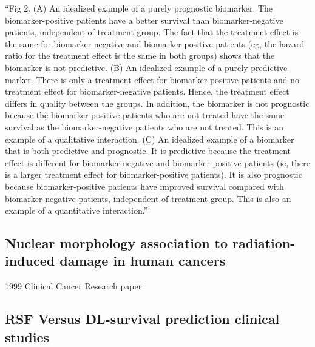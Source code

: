 \documentclass{article}%
\begin{document}
\newline%
\newline%
%
%
\newline%
\newline%
%
“Fig 2. (A) An idealized example of a purely prognostic biomarker. The biomarker{-}positive patients have a better survival than biomarker{-}negative patients, independent of treatment group. The fact that the treatment effect is the same for biomarker{-}negative and biomarker{-}positive patients (eg, the hazard ratio for the treatment effect is the same in both groups) shows that the biomarker is not predictive. (B) An idealized example of a purely predictive marker. There is only a treatment effect for biomarker{-}positive patients and no treatment effect for biomarker{-}negative patients. Hence, the treatment effect differs in quality between the groups. In addition, the biomarker is not prognostic because the biomarker{-}positive patients who are not treated have the same survival as the biomarker{-}negative patients who are not treated. This is an example of a qualitative interaction. (C) An idealized example of a biomarker that is both predictive and prognostic. It is predictive because the treatment effect is different for biomarker{-}negative and biomarker{-}positive patients (ie, there is a larger treatment effect for biomarker{-}positive patients). It is also prognostic because biomarker{-}positive patients have improved survival compared with biomarker{-}negative patients, independent of treatment group. This is also an example of a quantitative interaction.”%
\newline%
\newline%
%
%
\newline%
\newline%
%
\subsection{Nuclear morphology association to radiation{-}induced damage in human cancers }%
\label{subsec:Nuclearmorphologyassociationtoradiation{-}induceddamageinhumancancers}%

%
1999 Clinical Cancer Research paper %
\newline%
\newline%
%
%
\newline%
\newline%
%
\subsection{RSF Versus DL{-}survival prediction clinical studies }%
\label{subsec:RSFVersusDL{-}survivalpredictionclinicalstudies}%
\end{document}
